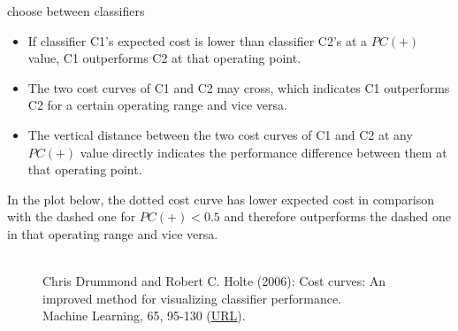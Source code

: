 
\begin{vbframe}{choose between classifiers}
  \begin{itemize}
    \item If classifier C1's expected cost is lower than classifier C2's at a $PC(+)$ value, C1 outperforms C2 at that operating point.
    \item The two cost curves of C1 and C2 may cross, which indicates C1 outperforms C2 for a certain operating range and vice versa.
    \item The vertical distance between the two cost curves of C1 and C2 at any $PC(+)$ value directly indicates the performance difference between them at that operating point.
  \end{itemize}
  \pagebreak
  In the plot below, the dotted cost curve has lower expected cost in comparison with the dashed one for $PC(+) < 0.5$ and therefore outperforms the dashed one in that operating range and vice versa.
  \begin{figure}
    \centering
    \tiny
    \\Chris Drummond and Robert C. Holte (2006): Cost curves: An improved
    method for visualizing classifier performance. \\Machine Learning, 65, 95-130
    (\href{https://www.semanticscholar.org/paper/Cost-curves\%3A-An-improved-method-for  -visualizing-Drummond-Holte/71708ce984e0896e7383435913547e770572410e}
    {\underline{URL}}).
  \end{figure}
  
\end{vbframe}


